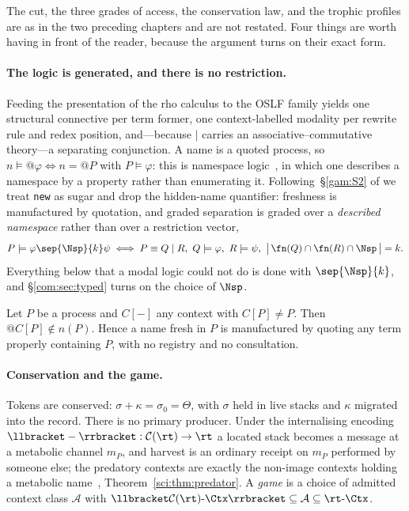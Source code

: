 The cut, the three grades of access, the conservation law, and the trophic
profiles are as in the two preceding chapters and are not restated. Four things
are worth having in front of the reader, because the argument turns on their
exact form.

\paragraph{The logic is generated, and there is no restriction.}
Feeding the presentation of the rho calculus to the OSLF family yields one structural connective
per term former, one context-labelled modality per rewrite rule and redex position, and---because
$\mid$ carries an associative--commutative theory---a separating conjunction. A name is a quoted
process, so $n \models @\varphi \iff n = @P$ with $P \models \varphi$: this is namespace
logic~\cite{NamespaceLogic}, in which one describes a namespace by a property rather than enumerating
it. Following~\S\ref{gam:S2} of \chGame we treat \texttt{new} as sugar and drop the hidden-name
quantifier: freshness is manufactured by quotation, and graded separation is graded over a
\emph{described namespace} rather than over a restriction vector,
\[
  P \models \varphi \sep{\Nsp}{k} \psi
  \iff
  P \equiv Q \mid R,\ Q \models \varphi,\ R \models \psi,\
  \bigl|\, \fn(Q) \cap \fn(R) \cap \Nsp \,\bigr| = k .
\]
Everything below that a modal logic could not do is done with $\sep{\Nsp}{k}$, and
\S\ref{com:sec:typed} turns on the choice of $\Nsp$.

\begin{proposition}\label{com:prop:fresh}
Let $P$ be a process and $C[-]$ any context with $C[P] \neq P$. Then $@C[P] \notin n(P)$. Hence a
name fresh in $P$ is manufactured by quoting any term properly containing $P$, with no registry
and no consultation.
\end{proposition}

\paragraph{Conservation and the game.}
Tokens are conserved: $\sigma + \kappa = \sigma_0 = \Theta$, with $\sigma$ held in live stacks
and $\kappa$ migrated into the record. There is no primary producer. Under the internalising
encoding $\llbracket - \rrbracket : \mathcal{C}(\rt) \to \rt$ a located stack becomes a message
at a metabolic channel $m_P$, and harvest is an ordinary receipt on $m_P$ performed by someone
else; the predatory contexts are exactly the non-image contexts holding a metabolic
name~\chSci, Theorem~\ref{sci:thm:predator}. A \emph{game} is a choice of admitted context class $\mathcal{A}$
with $\llbracket \mathcal{C}(\rt)\text{-}\Ctx \rrbracket \subseteq \mathcal{A} \subseteq
\rt\text{-}\Ctx$.

